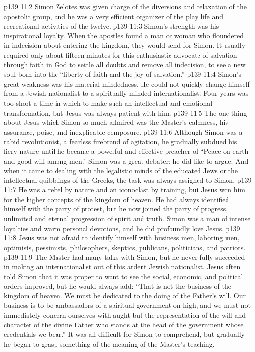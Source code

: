 \pc \vs p139 11:2 Simon Zelotes was given charge of the diversions and relaxation of the apostolic group, and he was a very efficient organizer of the play life and recreational activities of the twelve.
\vs p139 11:3 Simon’s strength was his inspirational loyalty. When the apostles found a man or woman who floundered in indecision about entering the kingdom, they would send for Simon. It usually required only about fifteen minutes for this enthusiastic advocate of salvation through faith in God to settle all doubts and remove all indecision, to see a new soul born into the “liberty of faith and the joy of salvation.”\plusone
\vs p139 11:4 Simon’s great weakness was his material\hyp{}mindedness. He could not quickly change himself from a Jewish nationalist to a spiritually minded internationalist. Four years was too short a time in which to make such an intellectual and emotional transformation, but Jesus was always patient with him.
\pc \vs p139 11:5 The one thing about Jesus which Simon so much admired was the Master’s calmness, his assurance, poise, and inexplicable composure.
\pc \vs p139 11:6 Although Simon was a rabid revolutionist, a fearless firebrand of agitation, he gradually subdued his fiery nature until he became a powerful and effective preacher of “Peace on earth and good will among men.” Simon was a great debater; he did like to argue. And when it came to dealing with the legalistic minds of the educated Jews or the intellectual quibblings of the Greeks, the task was always assigned to Simon.
\vs p139 11:7 He was a rebel by nature and an iconoclast by training, but Jesus won him for the higher concepts of the kingdom of heaven. He had always identified himself with the party of protest, but he now joined the party of progress, unlimited and eternal progression of spirit and truth. Simon was a man of intense loyalties and warm personal devotions, and he did profoundly love Jesus.
\pc \vs p139 11:8 Jesus was not afraid to identify himself with business men, laboring men, optimists, pessimists, philosophers, skeptics, publicans, politicians, and patriots.
\pc \vs p139 11:9 The Master had many talks with Simon, but he never fully succeeded in making an internationalist out of this ardent Jewish nationalist. Jesus often told Simon that it was proper to want to see the social, economic, and political orders improved, but he would always add: \textcolor{ubdarkred}{“That is not the business of the kingdom of heaven. We must be dedicated to the doing of the Father’s will. Our business is to be ambassadors of a spiritual government on high, and we must not immediately concern ourselves with aught but the representation of the will and character of the divine Father who stands at the head of the government whose credentials we bear.”} It was all difficult for Simon to comprehend, but gradually he began to grasp something of the meaning of the Master’s teaching.\plusone
